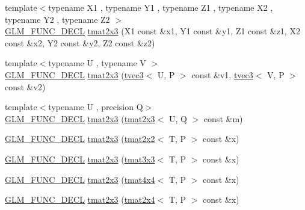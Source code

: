 \begin{DoxyCompactItemize}
\item 
{\footnotesize template$<$typename X1 , typename Y1 , typename Z1 , typename X2 , typename Y2 , typename Z2 $>$ }\\\hyperlink{setup_8hpp_ab2d052de21a70539923e9bcbf6e83a51}{G\+L\+M\+\_\+\+F\+U\+N\+C\+\_\+\+D\+E\+CL} \hyperlink{structglm_1_1detail_1_1tmat2x3_ac112d37bc3331b1735c1aeb591483bc0}{tmat2x3} (X1 const \&x1, Y1 const \&y1, Z1 const \&z1, X2 const \&x2, Y2 const \&y2, Z2 const \&z2)
\item 
{\footnotesize template$<$typename U , typename V $>$ }\\\hyperlink{setup_8hpp_ab2d052de21a70539923e9bcbf6e83a51}{G\+L\+M\+\_\+\+F\+U\+N\+C\+\_\+\+D\+E\+CL} \hyperlink{structglm_1_1detail_1_1tmat2x3_ab39c2ee73d04fb527773418e6595be57}{tmat2x3} (\hyperlink{structglm_1_1detail_1_1tvec3}{tvec3}$<$ U, P $>$ const \&v1, \hyperlink{structglm_1_1detail_1_1tvec3}{tvec3}$<$ V, P $>$ const \&v2)
\item 
{\footnotesize template$<$typename U , precision Q$>$ }\\\hyperlink{setup_8hpp_ab2d052de21a70539923e9bcbf6e83a51}{G\+L\+M\+\_\+\+F\+U\+N\+C\+\_\+\+D\+E\+CL} \hyperlink{structglm_1_1detail_1_1tmat2x3_aeada8034e24714a14c9d2480f5cf2fb6}{tmat2x3} (\hyperlink{structglm_1_1detail_1_1tmat2x3}{tmat2x3}$<$ U, Q $>$ const \&m)
\item 
\hyperlink{setup_8hpp_ab2d052de21a70539923e9bcbf6e83a51}{G\+L\+M\+\_\+\+F\+U\+N\+C\+\_\+\+D\+E\+CL} \hyperlink{structglm_1_1detail_1_1tmat2x3_a37bd9202b87e73c3d6e36cadce414457}{tmat2x3} (\hyperlink{structglm_1_1detail_1_1tmat2x2}{tmat2x2}$<$ T, P $>$ const \&x)
\item 
\hyperlink{setup_8hpp_ab2d052de21a70539923e9bcbf6e83a51}{G\+L\+M\+\_\+\+F\+U\+N\+C\+\_\+\+D\+E\+CL} \hyperlink{structglm_1_1detail_1_1tmat2x3_a1f1c6b71411b314a015c589cbbe34f7a}{tmat2x3} (\hyperlink{structglm_1_1detail_1_1tmat3x3}{tmat3x3}$<$ T, P $>$ const \&x)
\item 
\hyperlink{setup_8hpp_ab2d052de21a70539923e9bcbf6e83a51}{G\+L\+M\+\_\+\+F\+U\+N\+C\+\_\+\+D\+E\+CL} \hyperlink{structglm_1_1detail_1_1tmat2x3_a4dc8800ba18dd4b395c68faf51009776}{tmat2x3} (\hyperlink{structglm_1_1detail_1_1tmat4x4}{tmat4x4}$<$ T, P $>$ const \&x)
\item 
\hyperlink{setup_8hpp_ab2d052de21a70539923e9bcbf6e83a51}{G\+L\+M\+\_\+\+F\+U\+N\+C\+\_\+\+D\+E\+CL} \hyperlink{structglm_1_1detail_1_1tmat2x3_a54b8586adbda881d55b2c98a39ed58c5}{tmat2x3} (\hyperlink{structglm_1_1detail_1_1tmat2x4}{tmat2x4}$<$ T, P $>$ const \&x)
\item 

\end{DoxyCompactItemize}

